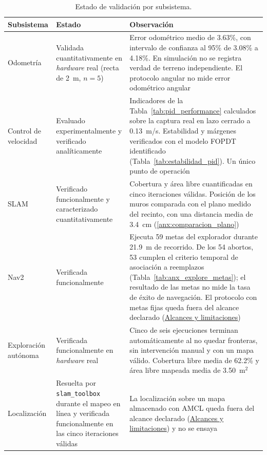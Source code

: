 \begin{table}[htbp]
\centering
\caption{Estado de validación por subsistema.}
\label{tab:estado_validacion}
\small
\begin{tabular}{p{2.1cm} p{5.4cm} p{5.9cm}}
\toprule
\textbf{Subsistema} & \textbf{Estado} & \textbf{Observación} \\
\midrule
Odometría & Validada cuantitativamente en \textit{hardware} real (recta de 2~m, $n=5$) & Error odométrico medio de 3.63\%, con intervalo de confianza al 95\% de 3.08\% a 4.18\%. En simulación no se registra verdad de terreno independiente. El protocolo angular no mide error odométrico angular \\
Control de velocidad & Evaluado experimentalmente y verificado analíticamente & Indicadores de la Tabla~\ref{tab:pid_performance} calculados sobre la captura real en lazo cerrado a 0.13~m/s. Estabilidad y márgenes verificados con el modelo FOPDT identificado (Tabla~\ref{tab:estabilidad_pid}). Un único punto de operación \\
SLAM & Verificado funcionalmente y caracterizado cuantitativamente &
Cobertura y área libre cuantificadas en cinco iteraciones válidas. Posición
de los muros comparada con el plano medido del recinto, con una distancia media
de 3.4~cm (\ref{anx:comparacion_plano}) \\
Nav2 & Verificada funcionalmente & Ejecuta 59 metas del explorador durante 21.9~m de recorrido. De los 54 abortos, 53 cumplen el criterio temporal de asociación a reemplazos (Tabla~\ref{tab:anx_explore_metas}); el resultado de las metas no mide la tasa de éxito de navegación. El protocolo con metas fijas queda fuera del alcance declarado (\hyperref[sec:alcances]{Alcances y limitaciones}) \\
Exploración autónoma & Verificada funcionalmente en \textit{hardware} real &
Cinco de seis ejecuciones terminan automáticamente al no quedar fronteras,
sin intervención manual y con un mapa válido. Cobertura libre media de 62.2\% y
área libre mapeada media de 3.50~m$^2$ \\
Localización & Resuelta por \texttt{slam\_toolbox} durante el mapeo en línea y
verificada funcionalmente en las cinco iteraciones válidas &
La localización sobre un mapa almacenado con AMCL queda fuera del alcance
declarado (\hyperref[sec:alcances]{Alcances y limitaciones}) y no se ensaya \\
\bottomrule
\end{tabular}
\end{table}

